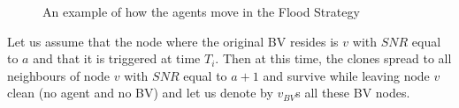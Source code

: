 \begin{figure} [H]
      \hspace{1in} 
  \caption{An example of how the agents move in the Flood Strategy} 
  \label{fig:Arbiflood} %
\end{figure}      

Let us assume that the node where the original BV resides is $v$ with $SNR$ equal to $a$ and that it is triggered at time $T_i$. Then at this time, the clones spread to all neighbours of node $v$ with $SNR$ equal to $a+1$ and survive while leaving node $v$ clean (no agent and no BV) and let us denote by $v_{BV}$s all these BV nodes.  


